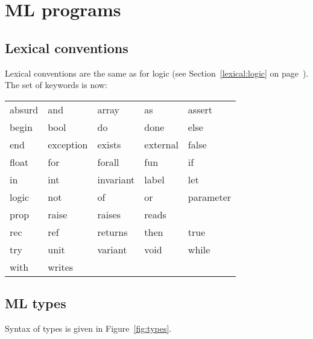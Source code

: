 \documentclass[a4paper,12pt]{report}
\begin{document}
\section{ML programs}
\label{syntax:ml}

\subsection{Lexical conventions}
\label{lexical:ml}

Lexical conventions are the same as for logic (see
Section~\ref{lexical:logic} on page~\pageref{lexical:logic}).
The set of keywords is now:
\begin{center}
{\tt\begin{tabular}{l@{\qquad}l@{\qquad}l@{\qquad}l@{\qquad}l}
absurd & and & array & as & assert  \\
begin & bool & do & done & else  \\
end & exception & exists & external & false  \\
float & for & forall & fun & if  \\
in & int & invariant & label & let  \\
logic & not & of & or & parameter \\
prop & raise & raises & reads \\
rec & ref & returns & then & true \\
try & unit & variant & void & while \\
with & writes
\end{tabular}}
\end{center}

\subsection{ML types}
\label{syntax:mltypes}

Syntax of types is given in Figure~\ref{fig:types}.
\end{document}
